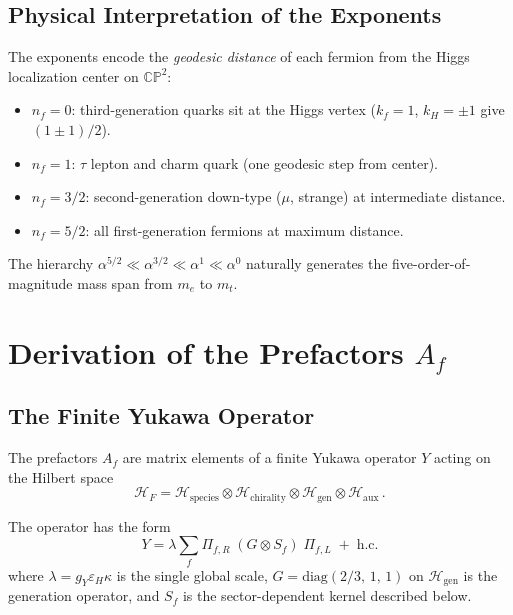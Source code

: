 \documentclass[11pt,a4paper]{article}
\newcommand{\CP}{\mathbb{CP}}
\begin{document}
\subsection{Physical Interpretation of the Exponents}

The exponents encode the \emph{geodesic distance} of each fermion from the Higgs
localization center on $\CP^2$:
\begin{itemize}
\item $n_f = 0$: third-generation quarks sit at the Higgs vertex ($k_f = 1$,
      $k_H = \pm 1$ give $(1\pm 1)/2$).
\item $n_f = 1$: $\tau$ lepton and charm quark (one geodesic step from center).
\item $n_f = 3/2$: second-generation down-type ($\mu$, strange) at intermediate distance.
\item $n_f = 5/2$: all first-generation fermions at maximum distance.
\end{itemize}

The hierarchy $\alpha^{5/2}\ll\alpha^{3/2}\ll\alpha^1\ll\alpha^0$ naturally generates the
five-order-of-magnitude mass span from $m_e$ to $m_t$.


\section{Derivation of the Prefactors $A_f$}
\label{sec:prefactors}

\subsection{The Finite Yukawa Operator}

The prefactors $A_f$ are matrix elements of a finite Yukawa operator $Y$ acting
on the Hilbert space
\[
\mathcal{H}_F = \mathcal{H}_{\text{species}} \otimes \mathcal{H}_{\text{chirality}}
\otimes \mathcal{H}_{\text{gen}} \otimes \mathcal{H}_{\text{aux}}\,.
\]

The operator has the form
\begin{equation}
\boxed{\quad Y = \lambda \sum_f \Pi_{f,R}\;(G \otimes S_f)\;\Pi_{f,L}
\;+\;\text{h.c.}\quad}
\label{eq:yukawa-op}
\end{equation}
where $\lambda = g_Y\varepsilon_H\kappa$ is the single global scale,
$G = \mathrm{diag}(2/3,\,1,\,1)$ on $\mathcal{H}_{\text{gen}}$ is the generation
operator, and $S_f$ is the sector-dependent kernel described below.
\end{document}
